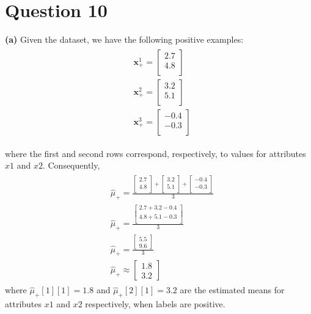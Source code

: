 \documentclass[leqno]{article}
\begin{document}
\section*{Question 10} \textbf{(a)} Given the dataset, we have the following positive examples:
\begin{gather*}
\begin{split}
&\textbf{x}_+^1 = 
 \begin{bmatrix}
   2.7 \\
   4.8 \\
 \end{bmatrix}\\
&\textbf{x}_+^2 = 
 \begin{bmatrix}
   3.2 \\
   5.1 \\
\end{bmatrix}\\
&\textbf{x}_+^3 = 
 \begin{bmatrix}
   -0.4 \\
   -0.3\\
 \end{bmatrix}
\end{split}
\end{gather*}

where the first and second rows correspond, respectively, to values for attributes $x1$ and $x2$. 
Consequently,  
\begin{gather*}
\begin{split}
&\hat{\mu}_+ = 
 \frac{ \begin{bmatrix}
   2.7 \\
   4.8\\ 
 \end{bmatrix} +  \begin{bmatrix}
   3.2 \\
   5.1\\ 
 \end{bmatrix} +  \begin{bmatrix}
   -0.4 \\
   -0.3 \\
 \end{bmatrix}}{3}\\
&\hat{\mu}_+ = 
 \frac{\begin{bmatrix}
   2.7 + 3.2 - 0.4\\
   4.8 + 5.1 - 0.3\\ 
   \end{bmatrix}}{3}\\
&\hat{\mu}_+ = 
 \frac{\begin{bmatrix}
   5.5\\
   9.6 
   \end{bmatrix}}{3}\\
&\hat{\mu}_+ \approx 
\begin{bmatrix}
   1.8\\
   3.2 
   \end{bmatrix}
\end{split}
\end{gather*}
where $\hat{\mu}_+[1][1] = 1.8$ and $\hat{\mu}_+[2][1] = 3.2$ are the estimated means for attributes $x1$ and $x2$ respectively, when labels are positive.
\end{document}
